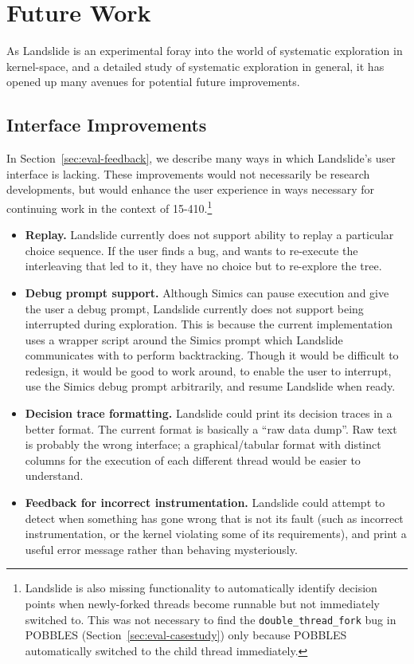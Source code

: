 \chapter{Future Work}
\label{sec:future}

As Landslide is an experimental foray into the world of systematic exploration in kernel-space, and a detailed study of systematic exploration in general, it has opened up many avenues for potential future improvements.

\section{Interface Improvements}
\label{sec:future-interface}

In Section~\ref{sec:eval-feedback}, we describe many ways in which Landslide's user interface is lacking. These improvements would not necessarily be research developments, but would enhance the user experience in ways necessary for continuing work in the context of 15-410.\footnote{
Landslide is also missing functionality to automatically identify decision points when newly-forked threads become runnable but not immediately switched to. This was not necessary to find the \texttt{double\_thread\_fork} bug in POBBLES (Section~\ref{sec:eval-casestudy}) only because POBBLES automatically switched to the child thread immediately.}

\begin{itemize}
	\item {\bf Replay.} Landslide currently does not support ability to replay a particular choice sequence. If the user finds a bug, and wants to re-execute the interleaving that led to it, they have no choice but to re-explore the tree.
	\item {\bf Debug prompt support.} Although Simics can pause execution and give the user a debug prompt, Landslide currently does not support being interrupted during exploration.
		This is because the current implementation uses a wrapper script around the Simics prompt which Landslide communicates with to perform backtracking.
		Though it would be difficult to redesign, it would be good to work around, to enable the user to interrupt, use the Simics debug prompt arbitrarily, and resume Landslide when ready.
	\item {\bf Decision trace formatting.} Landslide could print its decision traces in a better format. The current format is basically a ``raw data dump''. Raw text is probably the wrong interface; a graphical/tabular format with distinct columns for the execution of each different thread would be easier to understand.
	\item {\bf Feedback for incorrect instrumentation.} Landslide could attempt to detect when something has gone wrong that is not its fault (such as incorrect instrumentation, or the kernel violating some of its requirements), and print a useful error message rather than behaving mysteriously.
\end{itemize}

